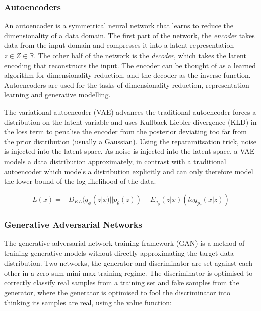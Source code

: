 \subsubsection{Autoencoders}

An autoencoder is a symmetrical neural network that learns to reduce the dimensionality of a data domain. 
The first part of the network, the \textit{encoder} takes data from the input domain and compresses it into a latent representation $z \in Z \in \mathbb{R}$. 
The other half of the network is the \textit{decoder}, which takes the latent encoding that reconstructs the input. 
The encoder can be thought of as a learned algorithm for dimensionality reduction, and the decoder as the inverse function. 
Autoencoders are used for the tasks of dimensionality reduction, representation learning and generative modelling.

The variational autoencoder (VAE) \citep{kingma2013auto, rezende2014stochastic} advances the traditional autoencoder forces a distribution on the latent variable and uses Kullback-Liebler divergence (KLD) in the loss term to penalise the encoder from the posterior deviating too far from the prior distribution (usually a Gaussian). 
Using the reparamitsation trick, noise is injected into the latent space. 
As noise is injected into the latent space, a VAE models a data distribution approximately, in contrast with a traditional autoencoder which models a distribution explicitly and can only therefore model the lower bound of the log-likelihood of the data. 

\begin{equation}
\label{eq:vae}
L(x) = -D_{KL}(q_{\phi}(z|x)||p_{\theta}(z)) + E_{q_\phi}(z|x)(log_{p_{\theta}}(x|z))
\end{equation}

\subsubsection{Generative Adversarial Networks}

The generative adversarial network training framework (GAN) \cite{goodfellow2014generative} is a method of training generative models without directly approximating the target data distribution. 
Two networks, the generator and discriminator are set against each other in a zero-sum mini-max training regime. 
The discriminator is optimised to correctly classify real samples from a training set and fake samples from the generator, where the generator is optimised to fool the discriminator into thinking its samples are real, using the value function: 

